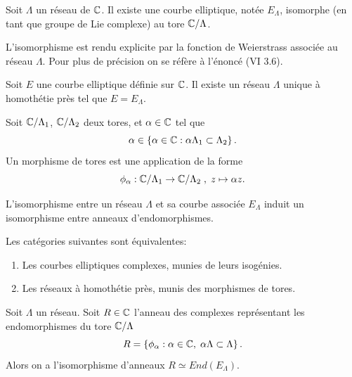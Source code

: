 \begin{Prop}
	Soit $\Lambda$ un réseau de $\mathbb{C}$. Il existe une courbe elliptique, notée $E_\Lambda$, isomorphe (en tant que groupe de Lie complexe) au tore $\mathbb{C}/\Lambda$.
\end{Prop}

\begin{Rem}
	L'isomorphisme est rendu explicite par la fonction de Weierstrass associée au réseau $\Lambda$. Pour plus de précision on se réfère à l'énoncé \cite{Sil09}(VI 3.6).
\end{Rem}

\begin{The}
	
	Soit $E$ une courbe elliptique définie sur $\mathbb{C}$. Il existe un réseau $\Lambda$ unique à homothétie près tel que $E = E_\Lambda$.
\end{The}


\begin{Def}
	Soit $\mathbb{C}/\Lambda_1$, $\mathbb{C}/\Lambda_2$ deux tores, et $\alpha\in\mathbb{C}$ tel que
	\begin{equation*}
		\alpha\in\left\lbrace \alpha\in\mathbb{C} : \alpha\Lambda_1 \subset \Lambda_2\right\rbrace. 
	\end{equation*} 
	Un morphisme de tores est une application de la forme
	\begin{equation*}
		\phi_{\alpha} : \mathbb{C}/\Lambda_1 \rightarrow \mathbb{C}/\Lambda_2\; ,\; z \mapsto \alpha z.
	\end{equation*}
\end{Def}

L'isomorphisme entre un réseau $\Lambda$ et sa courbe associée $E_\Lambda$ induit un isomorphisme entre anneaux d'endomorphismes.

\begin{The}
	Les catégories suivantes sont équivalentes:
	\begin{enumerate}
		\item Les courbes elliptiques complexes, munies de leurs isogénies.
		\item Les réseaux à homothétie près, munis des morphismes de tores.
	\end{enumerate}
\end{The}

\begin{Coro}\label{EndoToresIsoEndoCourbes}
	Soit $\Lambda$ un réseau. Soit $R\in\mathbb{C}$ l'anneau des complexes représentant les endomorphismes du tore $\mathbb{C}/\Lambda$
	\begin{equation*}
		R = \left\lbrace \phi_{\alpha} :  \alpha\in\mathbb{C} ,\; \alpha\Lambda \subset \Lambda \right\rbrace.
	\end{equation*}
	Alors on a l'isomorphisme d'anneaux $R\simeq End(E_{\Lambda})$.
\end{Coro}


